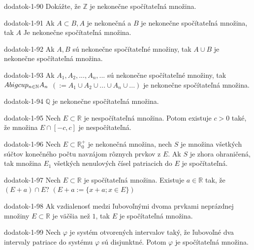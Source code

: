 \begin{defproblem}{dodatok-1-90}
Dokážte, že $\mathbb{Z}$ je nekonečne spočítateľná množina.
\end{defproblem}

\begin{defproblem}{dodatok-1-91}
Ak $A\subset B,A$ je nekonečná a $B$ je nekonečne spočítateľná množina, tak $A$ Je nekonečne spočítateľná množina.
\end{defproblem}

\begin{defproblem}{dodatok-1-92}
Ak $A,B$ sú nekonečne spočítateľné množiny, tak $A\cup B$ je nekonečne spočítateľná množina.
\end{defproblem}

\begin{defproblem}{dodatok-1-93}
Ak $A_1,A_2,...,A_n,...$ sú nekonečne spočítateľné množiny, tak $A\\bigcup_{n\in\mathbb{N}}A_n$ $(:=A_1\cup A_2\cup ...\cup A_n \cup ...)$ je nekonečne spočítateľná množina.
\end{defproblem}

\begin{defproblem}{dodatok-1-94}
$\mathbb{Q}$ je nekonečne spočítateľná množina.
\end{defproblem}

\begin{defproblem}{dodatok-1-95}
Nech $E\subset\mathbb{R}$ je nespočítateľná množina. Potom existuje $c>0$ také, že množina $E\cap [-c,c]$ je nespočítateľná.
\end{defproblem}

\begin{defproblem}{dodatok-1-96}
Nech $E\subset\mathbb{R}_0^+$ je nekonečná množina, nech $S$ je množina všetkých súčtov konečného počtu navzájom rôznych prvkov z $E$. Ak $S$ je zhora ohraničená, tak množina $E_1$ všetkých nenulových čísel patriacich do $E$ je spočítateľná.
\end{defproblem}

\begin{defproblem}{dodatok-1-97}
Nech $E\subset\mathbb{R}$ je spočítateľná množina. Existuje $a\in\mathbb{R}$ tak, že $(E+a)\cap E$? $(E+a:=\{x+a;x\in E\})$
\end{defproblem}

\begin{defproblem}{dodatok-1-98}
Ak vzdialenosť medzi ľubovoľnými dvoma prvkami neprázdnej množiny $E\subset\mathbb{R}$ je väčšia než $1$, tak $E$ je spočítateľná množina.
\end{defproblem}

\begin{defproblem}{dodatok-1-99}
Nech $\varphi$ je systém otvorených intervalov taký, že ľubovoľné dva intervaly patriace do systému $\varphi$ sú disjunktné. Potom $\varphi$ je spočítateľná množina.
\end{defproblem}